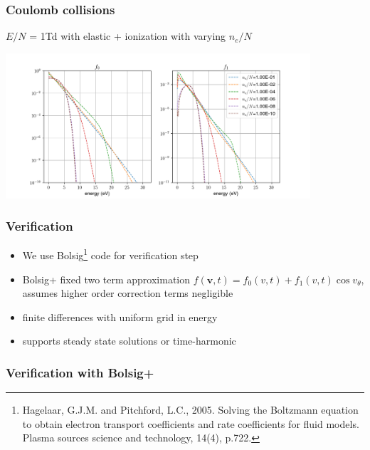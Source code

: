 \documentclass[mathserif, aspectratio=169]{beamer}
\newcommand{\vect}[1]{\boldsymbol{#1}}
\begin{document}
\begin{frame}
	\frametitle{Coulomb collisions}
	$E/N$ = 1Td with elastic + ionization with varying $n_e/N$
	\vspace*{-0.1in}
	\begin{center}
		\includegraphics[width=0.85\textwidth]{1Td_cc.png}
	\end{center}
\end{frame}

\begin{frame}
	\frametitle{Verification}
	\begin{itemize}
		\item We use Bolsig\footnote[frame]{Hagelaar, G.J.M. and Pitchford, L.C., 2005. Solving the Boltzmann equation to obtain electron transport coefficients and rate coefficients for fluid models. Plasma sources science and technology, 14(4), p.722.} code for verification step 
		\item Bolsig+ fixed two term approximation $f(\vect{v},t) = f_0(v, t) + f_1(v,t)\cos v_\theta$, assumes higher order correction terms negligible
		\item finite differences with uniform grid in energy
		\item supports steady state solutions or time-harmonic 
	\end{itemize}
\end{frame}

\begin{frame}[fragile]
	\frametitle{Verification with Bolsig+}	
	\begin{center}
	\end{center}
\end{frame}
\end{document}
